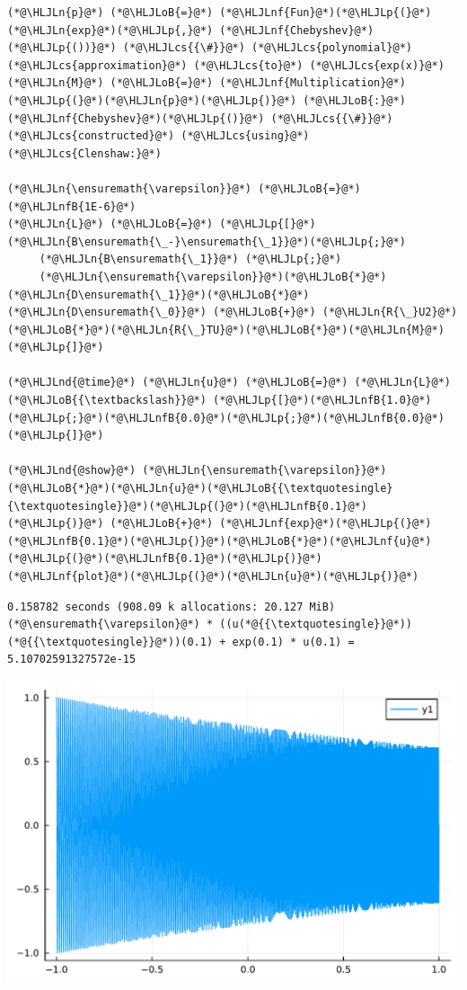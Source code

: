 \documentclass[12pt,a4paper]{article}
\newcommand{\HLJLn}[1]{#1}
\newcommand{\HLJLnd}[1]{\textcolor[RGB]{214,102,97}{#1}}
\newcommand{\HLJLnf}[1]{\textcolor[RGB]{66,102,213}{#1}}
\newcommand{\HLJLnfB}[1]{\textcolor[RGB]{59,151,46}{#1}}
\newcommand{\HLJLoB}[1]{\textcolor[RGB]{102,102,102}{\textbf{#1}}}
\newcommand{\HLJLp}[1]{#1}
\newcommand{\HLJLcs}[1]{\textcolor[RGB]{153,153,119}{\textit{#1}}}
\begin{document}
\begin{lstlisting}
(*@\HLJLn{p}@*) (*@\HLJLoB{=}@*) (*@\HLJLnf{Fun}@*)(*@\HLJLp{(}@*)(*@\HLJLn{exp}@*)(*@\HLJLp{,}@*) (*@\HLJLnf{Chebyshev}@*)(*@\HLJLp{())}@*) (*@\HLJLcs{{\#}}@*) (*@\HLJLcs{polynomial}@*) (*@\HLJLcs{approximation}@*) (*@\HLJLcs{to}@*) (*@\HLJLcs{exp(x)}@*)
(*@\HLJLn{M}@*) (*@\HLJLoB{=}@*) (*@\HLJLnf{Multiplication}@*)(*@\HLJLp{(}@*)(*@\HLJLn{p}@*)(*@\HLJLp{)}@*) (*@\HLJLoB{:}@*) (*@\HLJLnf{Chebyshev}@*)(*@\HLJLp{()}@*) (*@\HLJLcs{{\#}}@*) (*@\HLJLcs{constructed}@*) (*@\HLJLcs{using}@*) (*@\HLJLcs{Clenshaw:}@*)

(*@\HLJLn{\ensuremath{\varepsilon}}@*) (*@\HLJLoB{=}@*) (*@\HLJLnfB{1E-6}@*)
(*@\HLJLn{L}@*) (*@\HLJLoB{=}@*) (*@\HLJLp{[}@*)(*@\HLJLn{B\ensuremath{\_-}\ensuremath{\_1}}@*)(*@\HLJLp{;}@*)
     (*@\HLJLn{B\ensuremath{\_1}}@*) (*@\HLJLp{;}@*)
     (*@\HLJLn{\ensuremath{\varepsilon}}@*)(*@\HLJLoB{*}@*)(*@\HLJLn{D\ensuremath{\_1}}@*)(*@\HLJLoB{*}@*)(*@\HLJLn{D\ensuremath{\_0}}@*) (*@\HLJLoB{+}@*) (*@\HLJLn{R{\_}U2}@*)(*@\HLJLoB{*}@*)(*@\HLJLn{R{\_}TU}@*)(*@\HLJLoB{*}@*)(*@\HLJLn{M}@*)(*@\HLJLp{]}@*)

(*@\HLJLnd{@time}@*) (*@\HLJLn{u}@*) (*@\HLJLoB{=}@*) (*@\HLJLn{L}@*) (*@\HLJLoB{{\textbackslash}}@*) (*@\HLJLp{[}@*)(*@\HLJLnfB{1.0}@*)(*@\HLJLp{;}@*)(*@\HLJLnfB{0.0}@*)(*@\HLJLp{;}@*)(*@\HLJLnfB{0.0}@*)(*@\HLJLp{]}@*)

(*@\HLJLnd{@show}@*) (*@\HLJLn{\ensuremath{\varepsilon}}@*)(*@\HLJLoB{*}@*)(*@\HLJLn{u}@*)(*@\HLJLoB{{\textquotesingle}{\textquotesingle}}@*)(*@\HLJLp{(}@*)(*@\HLJLnfB{0.1}@*)(*@\HLJLp{)}@*) (*@\HLJLoB{+}@*) (*@\HLJLnf{exp}@*)(*@\HLJLp{(}@*)(*@\HLJLnfB{0.1}@*)(*@\HLJLp{)}@*)(*@\HLJLoB{*}@*)(*@\HLJLnf{u}@*)(*@\HLJLp{(}@*)(*@\HLJLnfB{0.1}@*)(*@\HLJLp{)}@*)
(*@\HLJLnf{plot}@*)(*@\HLJLp{(}@*)(*@\HLJLn{u}@*)(*@\HLJLp{)}@*)
\end{lstlisting}

\begin{lstlisting}
0.158782 seconds (908.09 k allocations: 20.127 MiB)
(*@\ensuremath{\varepsilon}@*) * ((u(*@{{\textquotesingle}}@*))(*@{{\textquotesingle}}@*))(0.1) + exp(0.1) * u(0.1) = 5.10702591327572e-15
\end{lstlisting}

\includegraphics[width=\linewidth]{jl_hpkPoK/OP_methods_test_47_1.pdf}
\end{document}
